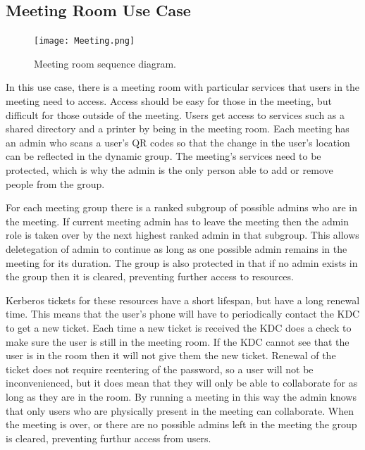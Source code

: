 \documentclass[]{report}   %
\begin{document}
\subsection{Meeting Room Use Case}
\begin{figure}[H]
\centering
\texttt{[image: Meeting.png]}
\caption{Meeting room sequence diagram.}
\end{figure}
In this use case, there is a meeting room with particular services that users in the meeting need to access. Access should be easy for those in the meeting, but difficult for those outside of the meeting. Users get access to services such as a shared directory and a printer by being in the meeting room. Each meeting has an admin who scans a user's QR codes so that the change in the user's location can be reflected in the dynamic group. The meeting's services need to be protected, which is why the admin is the only person able to add or remove people from the group.

For each meeting group there is a ranked subgroup of possible admins who are in the meeting. If current meeting admin has to leave the meeting then the admin role is taken over by the next highest ranked admin in that subgroup. This allows deletegation of admin to continue as long as one possible admin remains in the meeting for its duration. The group is also protected in that if no admin exists in the group then it is cleared, preventing further access to resources.

Kerberos tickets for these resources have a short lifespan, but have a long renewal time. This means that the user's phone will have to periodically contact the KDC to get a new ticket. Each time a new ticket is received the KDC does a check to make sure the user is still in the meeting room. If the KDC cannot see that the user is in the room then it will not give them the new ticket. Renewal of the ticket does not require reentering of the password, so a user will not be inconvenienced, but it does mean that they will only be able to collaborate for as long as they are in the room. By running a meeting in this way the admin knows that only users who are physically present in the meeting can collaborate. When the meeting is over, or there are no possible admins left in the meeting the group is cleared, preventing furthur access from users.
\end{document}

